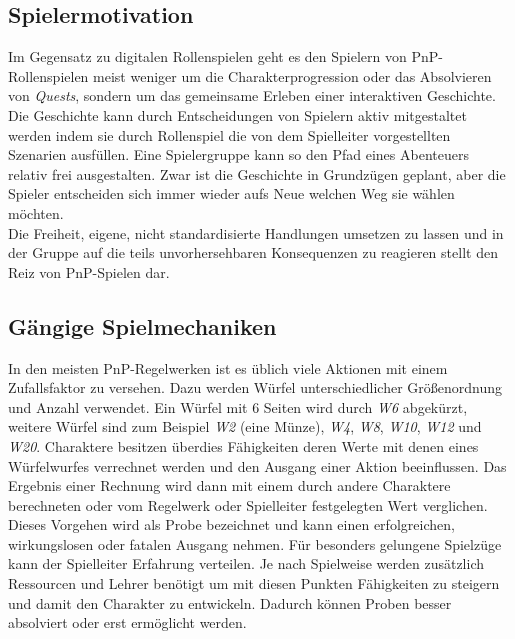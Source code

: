 \subsection{Spielermotivation}
\label{sec:Spielermotivation}

Im Gegensatz zu digitalen Rollenspielen geht es den Spielern von PnP-Rollenspielen meist weniger um die Charakterprogression oder das Absolvieren von \emph{Quests}, sondern um das gemeinsame Erleben einer interaktiven Geschichte. Die Geschichte kann durch Entscheidungen von Spielern aktiv mitgestaltet werden indem sie durch Rollenspiel die von dem Spielleiter vorgestellten Szenarien ausfüllen. Eine Spielergruppe kann so den Pfad eines Abenteuers relativ frei ausgestalten. Zwar ist die Geschichte in Grundzügen geplant, aber die Spieler entscheiden sich immer wieder aufs Neue welchen Weg sie wählen möchten. \cite{Arinbjarnar}\\
Die Freiheit, eigene, nicht standardisierte Handlungen umsetzen zu lassen und in der Gruppe auf die teils unvorhersehbaren Konsequenzen zu reagieren stellt den Reiz von PnP-Spielen dar. 


\subsection{Gängige Spielmechaniken}
\label{sec:Spielmechaniken}

In den meisten PnP-Regelwerken ist es üblich viele Aktionen mit einem Zufallsfaktor zu versehen. Dazu werden Würfel unterschiedlicher Größenordnung und Anzahl verwendet. Ein Würfel mit 6 Seiten wird durch \textit{W6} abgekürzt, weitere Würfel sind zum Beispiel \textit{W2} (eine Münze), \textit{W4}, \textit{W8}, \textit{W10}, \textit{W12} und \textit{W20}.\newline
Charaktere besitzen überdies Fähigkeiten deren Werte mit denen eines Würfelwurfes verrechnet werden und den Ausgang einer Aktion beeinflussen. Das Ergebnis einer Rechnung wird dann mit einem durch andere Charaktere berechneten oder vom Regelwerk oder Spielleiter festgelegten Wert verglichen. Dieses Vorgehen wird als Probe bezeichnet und kann einen erfolgreichen, wirkungslosen oder fatalen Ausgang nehmen.\newline
Für besonders gelungene Spielzüge kann der Spielleiter Erfahrung verteilen. Je nach Spielweise werden zusätzlich Ressourcen und Lehrer benötigt um mit diesen Punkten Fähigkeiten zu steigern und damit den Charakter zu entwickeln. Dadurch können Proben besser absolviert oder erst ermöglicht werden.


